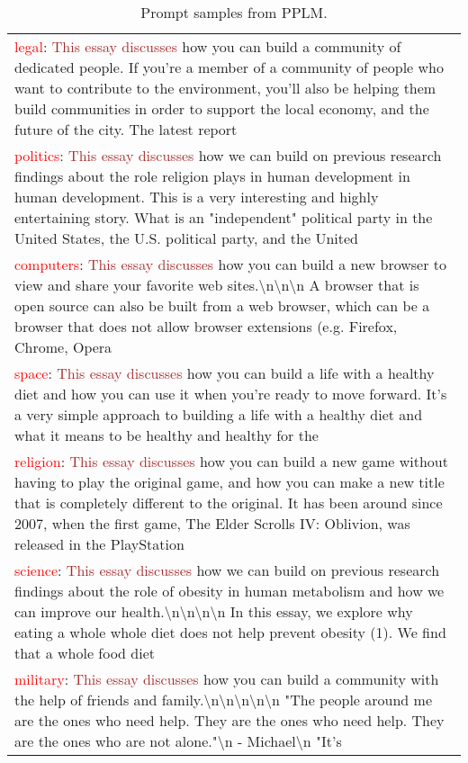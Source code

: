 \begin{table*}
\begin{tabular}{p{}}
\textcolor{red}{legal}: \textcolor{brown}{This essay discusses} how you can build a community of dedicated people. If you're a member of a community of people who want to contribute to the environment, you'll also be helping them build communities in order to support the local economy, and the future of the city. The latest report \\
\textcolor{red}{politics}: \textcolor{brown}{This essay discusses} how we can build on previous research findings about the role religion plays in human development in human development. This is a very interesting and highly entertaining story. What is an "independent" political party in the United States, the U.S. political party, and the United \\
\textcolor{red}{computers}: \textcolor{brown}{This essay discusses} how you can build a new browser to view and share your favorite web sites.\textbackslash n\textbackslash n\textbackslash n A browser that is open source can also be built from a web browser, which can be a browser that does not allow browser extensions (e.g. Firefox, Chrome, Opera \\
\textcolor{red}{space}: \textcolor{brown}{This essay discusses} how you can build a life with a healthy diet and how you can use it when you're ready to move forward. It's a very simple approach to building a life with a healthy diet and what it means to be healthy and healthy for the \\
\textcolor{red}{religion}: \textcolor{brown}{This essay discusses} how you can build a new game without having to play the original game, and how you can make a new title that is completely different to the original. It has been around since 2007, when the first game, The Elder Scrolls IV: Oblivion, was released in the PlayStation \\
\textcolor{red}{science}: \textcolor{brown}{This essay discusses} how we can build on previous research findings about the role of obesity in human metabolism and how we can improve our health.\textbackslash n\textbackslash n\textbackslash n\textbackslash n In this essay, we explore why eating a whole whole diet does not help prevent obesity (1). We find that a whole food diet \\
\textcolor{red}{military}: \textcolor{brown}{This essay discusses} how you can build a community with the help of friends and family.\textbackslash n\textbackslash n\textbackslash n\textbackslash n\textbackslash n "The people around me are the ones who need help. They are the ones who need help. They are the ones who are not alone."\textbackslash n - Michael\textbackslash n "It's \\
\bottomrule
\end{tabular}
\caption{Prompt samples from PPLM.}
\label{table:prompt-examples-pplm}
\end{table*}